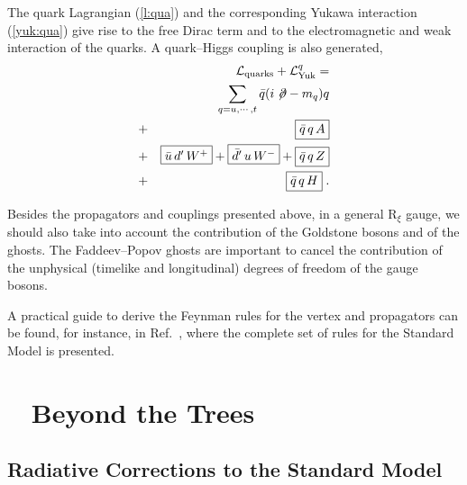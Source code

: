 \documentclass[12pt]{report}
\def\text#1{{\scriptstyle\mathrm{#1}}}
\newcommand{\lag}{{\cal L}}
\newcommand{\dels}{\not \! \partial}
\begin{document}
The quark Lagrangian (\ref{l:qua}) and the corresponding Yukawa
interaction (\ref{yuk:qua}) give rise to the free Dirac term and to
the electromagnetic and weak interaction of the quarks. A quark--Higgs
coupling is also generated,
\begin{eqnarray}
&&\lag_{\text{quarks}} + \lag_{\text{Yuk}}^q =
\label{qua:yuk} \\
&&\sum_{q = u, \cdots , t}  \bar{q} (i \dels - m_q) q 
\nonumber \\   
&+& \fbox{$\bar{q} \, q \, A$} 
\nonumber \\  
&+& \fbox{$\bar{u} \, d^\prime \, W^+$} + \fbox{$\bar{d}^\prime \, u \, W^-$} + 
\fbox{$\bar{q} \, q \, Z$} 
\nonumber \\  
&+& \fbox{$\bar{q} \, q \, H$} \; . \nonumber
\end{eqnarray}

Besides the propagators and couplings presented above, in a general
R$_\xi$ gauge, we should also take into account the contribution of
the Goldstone bosons and of the ghosts. The Faddeev--Popov ghosts
\cite{Faddeev:67} are important to cancel the contribution of the
unphysical (timelike and longitudinal) degrees of freedom of the gauge
bosons. 

A practical guide to derive the Feynman rules for the vertex and
propagators can be found, for instance, in Ref.\ \cite{Cheng:84},
where the complete set of rules for the Standard Model is presented.


\chapter{ ~ Beyond the Trees} \label{loops}

\section{Radiative Corrections to the Standard Model}\indent
\end{document}
